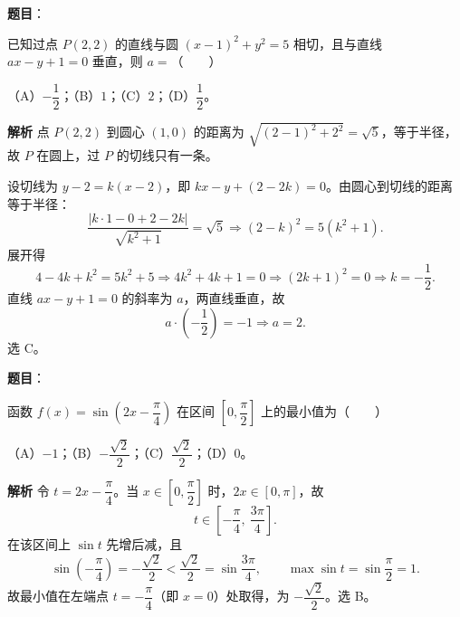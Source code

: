 \begin{answer}

\textbf{题目}：

已知过点 $P(2,2)$ 的直线与圆 $(x-1)^2+y^2=5$ 相切，且与直线 $ax-y+1=0$ 垂直，则 $a=$\mbox{（　　）}

（A）$-\dfrac12$；（B）$1$；（C）$2$；（D）$\dfrac12$。

\textbf{解析}
点 $P(2,2)$ 到圆心 $(1,0)$ 的距离为 $\sqrt{(2-1)^2+2^2}=\sqrt5$，等于半径，故 $P$ 在圆上，过 $P$ 的切线只有一条。

设切线为 $y-2=k(x-2)$，即 $kx-y+(2-2k)=0$。由圆心到切线的距离等于半径：
\nopagebreak[4]
\[\frac{|k\cdot1-0+2-2k|}{\sqrt{k^2+1}}=\sqrt5\Longrightarrow(2-k)^2=5(k^2+1).\]
展开得
\nopagebreak[4]
\[4-4k+k^2=5k^2+5\Longrightarrow4k^2+4k+1=0\Longrightarrow(2k+1)^2=0\Longrightarrow k=-\frac12.\]
直线 $ax-y+1=0$ 的斜率为 $a$，两直线垂直，故
\nopagebreak[4]
\[a\cdot\left(-\frac12\right)=-1\Longrightarrow a=2.\]
选 C。


\end{answer}
\begin{answer}

\textbf{题目}：

函数 $f(x)=\sin\left(2x-\dfrac\pi4\right)$ 在区间 $\left[0,\dfrac\pi2\right]$ 上的最小值为\mbox{（　　）}

（A）$-1$；（B）$-\dfrac{\sqrt2}2$；（C）$\dfrac{\sqrt2}2$；（D）$0$。

\textbf{解析}
令 $t=2x-\dfrac\pi4$。当 $x\in\left[0,\dfrac\pi2\right]$ 时，$2x\in[0,\pi]$，故
\nopagebreak[4]
\[t\in\left[-\frac\pi4,\ \frac{3\pi}4\right].\]
在该区间上 $\sin t$ 先增后减，且
\nopagebreak[4]
\[\sin\left(-\frac\pi4\right)=-\frac{\sqrt2}2<\frac{\sqrt2}2=\sin\frac{3\pi}4,\qquad \max\sin t=\sin\frac\pi2=1.\]
故最小值在左端点 $t=-\dfrac\pi4$（即 $x=0$）处取得，为 $-\dfrac{\sqrt2}2$。选 B。


\end{answer}
